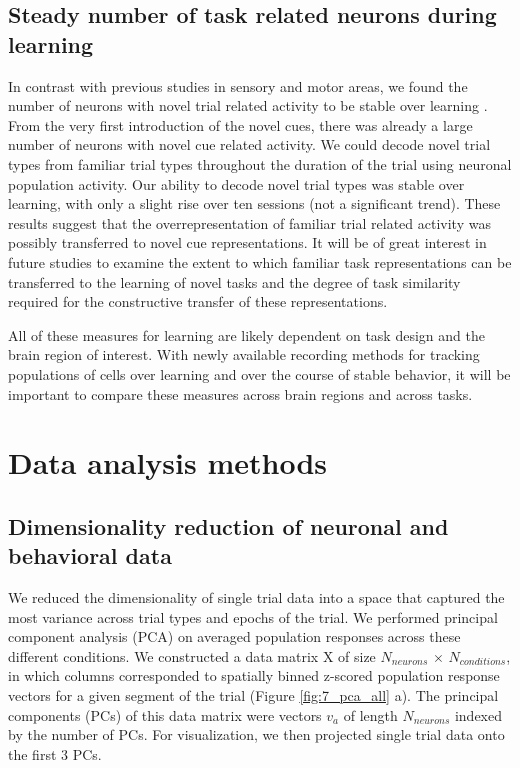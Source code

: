\subsection{Steady number of task related neurons during learning}
 In contrast with previous studies in sensory and motor areas, we found the number of neurons with novel trial related activity to be stable over learning \citep{Poort2015, Peters2014}. From the very first introduction of the novel cues, there was already a large number of neurons with novel cue related activity. We could decode novel trial types from familiar trial types throughout the duration of the trial using neuronal population activity. Our ability to decode novel trial types was stable over learning, with only a slight rise over ten sessions (not a significant trend). These results suggest that the overrepresentation of familiar trial related activity was possibly transferred to novel cue representations. It will be of great interest in future studies to examine the extent to which familiar task representations can be transferred to the learning of novel tasks and the degree of task similarity required for the constructive transfer of these representations.

\bigskip

All of these measures for learning are likely dependent on task design and the brain region of interest. With newly available recording methods for tracking populations of cells over learning and over the course of stable behavior, it will be important to compare these measures across brain regions and across tasks.

\section{Data analysis methods}

\subsection{Dimensionality reduction of neuronal and behavioral data}
We reduced the dimensionality of single trial data into a space that captured the most variance across trial types and epochs of the trial. We performed principal component analysis (PCA) on averaged population responses across these different conditions. We constructed a data matrix X of size $N_{neurons}$ $\times$ $N_{conditions}$, in which columns corresponded to spatially binned z-scored population response vectors for a given segment of the trial (Figure \ref{fig:7_pca_all} a). The principal components (PCs) of this data matrix were vectors $v_a$ of length $N_{neurons}$ indexed by the number of PCs. For visualization, we then projected single trial data onto the first 3 PCs. 

